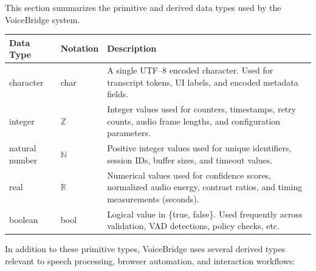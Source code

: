 \documentclass[12pt, titlepage]{article}
\begin{document}
This section summarizes the primitive and derived data types used by
the VoiceBridge system.

\begin{center}
\renewcommand{\arraystretch}{1.2}
\noindent
\begin{tabular}{l l p{7.5cm}}
\toprule
\textbf{Data Type} & \textbf{Notation} & \textbf{Description} \\
\midrule
character & char & A single UTF--8 encoded character. Used for transcript tokens, UI labels, and encoded metadata fields.\\
integer & $\mathbb{Z}$ & Integer values used for counters, timestamps, retry counts, audio frame lengths, and configuration parameters. \\
natural number & $\mathbb{N}$ & Positive integer values used for unique identifiers, session IDs, buffer sizes, and timeout values. \\
real & $\mathbb{R}$ & Numerical values used for confidence scores, normalized audio energy, contrast ratios, and timing measurements (seconds).\\
boolean & bool & Logical value in \{true, false\}. Used frequently across validation, VAD detections, policy checks, etc.\\
\bottomrule
\end{tabular}
\end{center}

\noindent
In addition to these primitive types, VoiceBridge uses several derived types relevant
to speech processing, browser automation, and interaction workflows:
\end{document}
